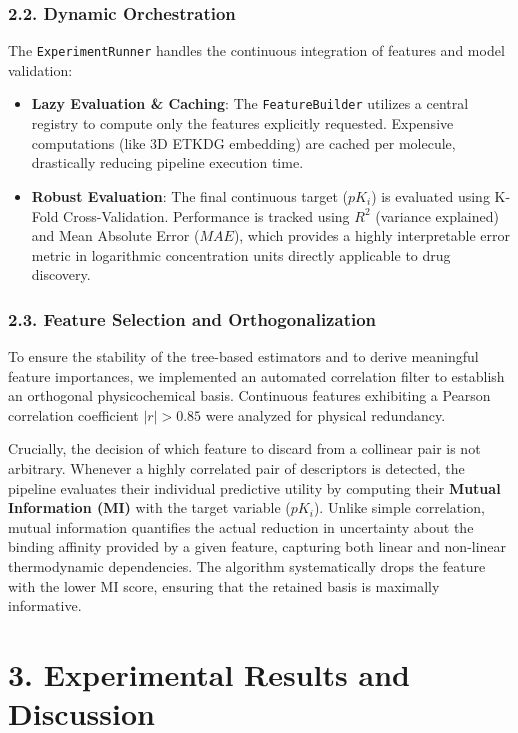 \documentclass[11pt, a4paper]{article}
\begin{document}
\subsubsection*{2.2. Dynamic Orchestration}
The \texttt{ExperimentRunner} handles the continuous integration of features and model validation:
\begin{itemize}[leftmargin=*]
    \item \textbf{Lazy Evaluation \& Caching}: The \texttt{FeatureBuilder} utilizes a central registry to compute only the features explicitly
    requested. Expensive computations (like 3D ETKDG embedding) are cached per molecule, drastically reducing pipeline execution time.
    \item \textbf{Robust Evaluation}: The final continuous target ($pK_i$) is evaluated using K-Fold Cross-Validation. Performance is tracked
    using $R^2$ (variance explained) and Mean Absolute Error ($MAE$), which provides a highly interpretable error metric in logarithmic
    concentration units directly applicable to drug discovery.
\end{itemize}

\subsubsection*{2.3. Feature Selection and Orthogonalization}
To ensure the stability of the tree-based estimators and to derive meaningful feature importances, we implemented an automated correlation
filter to establish an orthogonal physicochemical basis. Continuous features exhibiting a Pearson correlation coefficient $|r| > 0.85$ were
analyzed for physical redundancy. 

Crucially, the decision of which feature to discard from a collinear pair is not arbitrary. Whenever a highly correlated pair of descriptors
is detected, the pipeline evaluates their individual predictive utility by computing their \textbf{Mutual Information (MI)} with the target
variable ($pK_i$). Unlike simple correlation, mutual information quantifies the actual reduction in uncertainty about the binding affinity
provided by a given feature, capturing both linear and non-linear thermodynamic dependencies. The algorithm systematically drops the feature
with the lower MI score, ensuring that the retained basis is maximally informative.

\section*{3. Experimental Results and Discussion}
\end{document}
